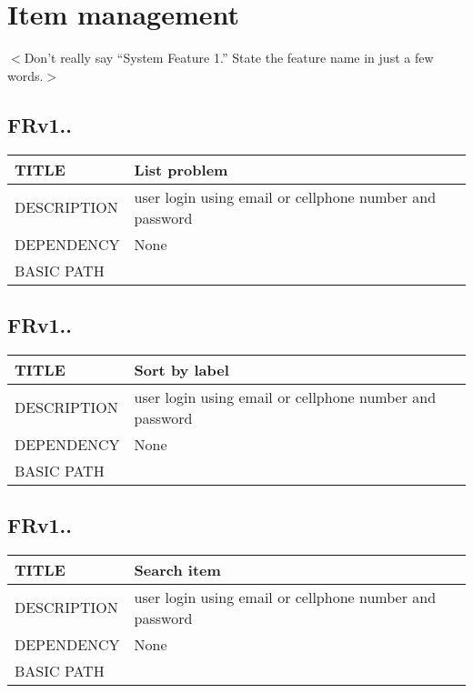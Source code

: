 \documentclass{scrreprt}
\begin{document}
\section{Item management}
$<$Don’t really say “System Feature 1.” State the feature name in just a few 
words.$>$

\subsection{FRv1..}
\begin{table}[]
    \centering
    \begin{tabular}{|l|l|}
        \hline
         TITLE& List problem\\ \hline
         DESCRIPTION& user login using email or cellphone number and password   \\ \hline
         DEPENDENCY& None \\ \hline
         BASIC PATH&  \\ \hline
    \end{tabular}
\end{table}

\subsection{FRv1..}
\begin{table}[]
    \centering
    \begin{tabular}{|l|l|}
        \hline
         TITLE& Sort by label\\ \hline
         DESCRIPTION& user login using email or cellphone number and password   \\ \hline
         DEPENDENCY& None \\ \hline
         BASIC PATH&  \\ \hline
    \end{tabular}
\end{table}

\subsection{FRv1..}
\begin{table}[]
    \centering
    \begin{tabular}{|l|l|}
        \hline
         TITLE& Search item\\ \hline
         DESCRIPTION& user login using email or cellphone number and password   \\ \hline
         DEPENDENCY& None \\ \hline
         BASIC PATH&  \\ \hline
    \end{tabular}
\end{table}
\end{document}
